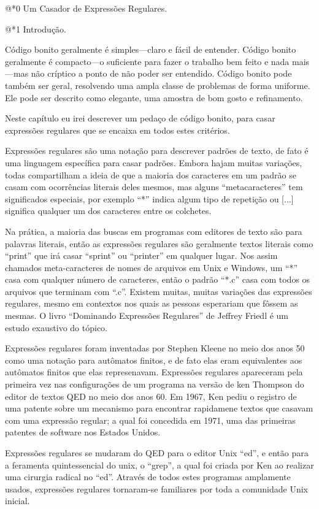 @*0 Um Casador de Expressões Regulares.

@*1 Introdução.

Código bonito geralmente é simples---claro e fácil de entender. Código
bonito geralmente é compacto---o suficiente para fazer o trabalho bem
feito e nada mais---mas não críptico a ponto de não poder ser
entendido. Código bonito pode também ser geral, resolvendo uma ampla
classe de problemas de forma uniforme. Ele pode ser descrito como
elegante, uma amostra de bom gosto e refinamento.

Neste capítulo eu irei descrever um pedaço de código bonito, para
casar expressões regulares que se encaixa em todos estes critérios.

Expressões regulares são uma notação para descrever padrões de texto,
de fato é uma linguagem específica para casar padrões. Embora hajam
muitas variações, todas compartilham a ideia de que a maioria dos
caracteres em um padrão se casam com ocorrências literais deles
mesmos, mas alguns ``metacaracteres'' tem significados especiais, por
exemplo ``*'' indica algum tipo de repetição ou [...] significa
qualquer um dos caracteres entre os colchetes.

Na prática, a maioria das buscas em programas com editores de texto
são para palavras literais, então as expressões regulares são
geralmente textos literais como ``print'' que irá casar ``sprint'' ou
``printer'' em qualquer lugar. Nos assim chamados meta-caracteres de
nomes de arquivos em Unix e Windows, um ``*'' casa com qualquer número
de caracteres, então o padrão ``*.c'' casa com todos os arquivos que
terminam com ``.c''. Existem muitas, muitas variações das expressões
regulares, mesmo em contextos nos quais as pessoas esperariam que
fôssem as mesmas. O livro ``Dominando Expressões Regulares'' de
Jeffrey Friedl é um estudo exaustivo do tópico.

Expressões regulares foram inventadas por Stephen Kleene no meio dos
anos 50 como uma notação para autômatos finitos, e de fato elas eram
equivalentes aos autômatos finitos que elas represenavam. Expressões
regulares apareceram pela primeira vez nas configurações de um
programa na versão de ken Thompson do editor de textos QED no meio dos
anos 60. Em 1967, Ken pediu o registro de uma patente sobre um
mecanismo para encontrar rapidamene textos que casavam com uma
expressão regular; a qual foi concedida em 1971, uma das primeiras
patentes de software nos Estados Unidos.

Expressões regulares se mudaram do QED para o editor Unix ``ed'', e
então para a feramenta quintessencial do unix, o ``grep'', a qual foi
criada por Ken ao realizar uma cirurgia radical no ``ed''. Através de
todos estes programas amplamente usados, expressões regulares
tornaram-se familiares por toda a comunidade Unix inicial.

